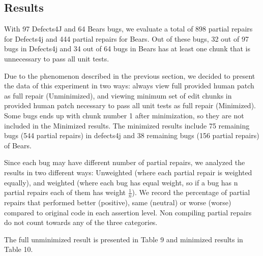 \documentclass[sigconf, timestamp-false, anonymous=true]{acmart}
\begin{document}
\subsection{Results}

With 97 Defects4J and 64 Bears bugs, we evaluate
a total of 898 partial repairs for Defects4j and 444 partial repairs for Bears.
Out of these bugs, 32 out of 97 bugs in Defects4j and 
34 out of 64 bugs in Bears has at least one chunk that
is unnecessary to pass all unit tests.

Due to the phenomenon described in the previous section, we decided to present the
data of this experiment in two ways: always view full provided human patch as full repair
(Unminimized), and viewing minimum set of edit chunks in provided human patch necessary
to pass all unit tests as full repair (Minimized).
Some bugs ends up with chunk number 1 after minimization, 
so they are not included in the Minimized results. The minimized results 
include 75 remaining bugs (544 partial repairs) in defects4j and 38 remaining bugs (156 partial repairs) of Bears. 

Since each bug may have different 
number of partial repairs, we analyzed the results in two different ways: 
Unweighted (where each partial repair is weighted equally), and weighted (where each bug 
has equal weight, so if a bug has n partial repairs each of them has weight 
$\frac{1}{n}$). We record the percentage of partial repairs that performed better (positive), same (neutral)
or worse (worse) compared to original code in each assertion level. Non compiling
partial repairs do not count towards any of the three categories.

The full unminimized result is presented in Table 9 and minimized results in Table 10.
\end{document}
